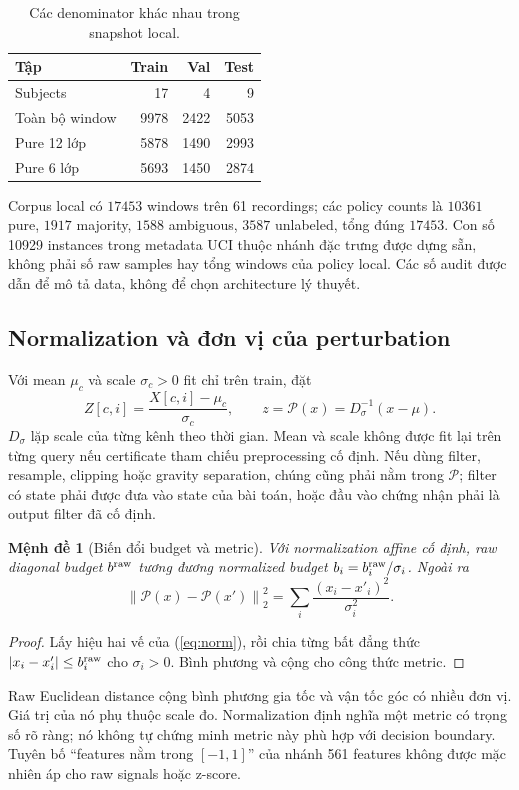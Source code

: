 \documentclass[11pt,a4paper]{article}
\newcommand{\norm}[1]{\left\lVert #1\right\rVert}
\newtheorem{proposition}[definition]{Mệnh đề}
\theoremstyle{remark}
\begin{document}
\begin{table}[!htbp]\centering
\caption{Các denominator khác nhau trong snapshot local.}
\begin{tabularx}{\linewidth}{@{}Yrrr@{}}\toprule
Tập & Train & Val & Test\\\midrule
Subjects &17&4&9\\
Toàn bộ window &9978&2422&5053\\
Pure 12 lớp &5878&1490&2993\\
Pure 6 lớp &5693&1450&2874\\\bottomrule
\end{tabularx}
\end{table}
Corpus local có $17453$ windows trên 61 recordings; các policy counts là
$10361$ pure, $1917$ majority, $1588$ ambiguous, $3587$ unlabeled, tổng đúng
$17453$. Con số 10929 instances trong metadata UCI thuộc nhánh đặc trưng
được dựng sẵn, không phải số raw samples hay tổng windows của policy local.
Các số audit được dẫn để mô tả data, không để chọn architecture lý thuyết.

\subsection{Normalization và đơn vị của perturbation}
Với mean $\mu_c$ và scale $\sigma_c>0$ fit chỉ trên train, đặt
\begin{equation}
 Z[c,i]=\frac{X[c,i]-\mu_c}{\sigma_c},\qquad
 z=\mathcal P(x)=D_\sigma^{-1}(x-\mu).
 \label{eq:norm}
\end{equation}
$D_\sigma$ lặp scale của từng kênh theo thời gian. Mean và scale không được
fit lại trên từng query nếu certificate tham chiếu preprocessing cố định.
Nếu dùng filter, resample, clipping hoặc gravity separation, chúng cũng
phải nằm trong $\mathcal P$; filter có state phải được đưa vào state của
bài toán, hoặc đầu vào chứng nhận phải là output filter đã cố định.

\begin{proposition}[Biến đổi budget và metric]
Với normalization affine cố định, raw diagonal budget $b^{\rm raw}$ tương
đương normalized budget $b_i=b_i^{\rm raw}/\sigma_i$. Ngoài ra
\begin{equation}
 \norm{\mathcal P(x)-\mathcal P(x')}^2_2
 =\sum_i\frac{(x_i-x'_i)^2}{\sigma_i^2}.
\end{equation}
\end{proposition}
\begin{proof}
Lấy hiệu hai vế của (\ref{eq:norm}), rồi chia từng bất đẳng thức
$|x_i-x_i'|\le b_i^{\rm raw}$ cho $\sigma_i>0$. Bình phương và cộng cho
công thức metric.
\end{proof}
Raw Euclidean distance cộng bình phương gia tốc và vận tốc góc có nhiều
đơn vị. Giá trị của nó phụ thuộc scale đo. Normalization định nghĩa một
metric có trọng số rõ ràng; nó không tự chứng minh metric này phù hợp với
decision boundary. Tuyên bố ``features nằm trong $[-1,1]$'' của nhánh
561 features không được mặc nhiên áp cho raw signals hoặc z-score.
\end{document}
